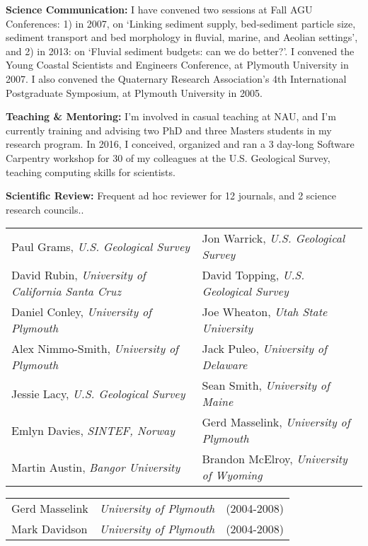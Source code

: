 \listing
{\bf Science Communication:} I have convened two sessions at Fall AGU Conferences: 1) in 2007, on ‘Linking sediment supply, bed-sediment particle size, sediment transport and bed morphology in fluvial, marine, and Aeolian settings’, and 2) in 2013: on ‘Fluvial sediment budgets: can we do better?’. I convened the Young Coastal Scientists and Engineers Conference, at Plymouth University in 2007. I also convened the Quaternary Research Association’s 4th International Postgraduate Symposium, at Plymouth University in 2005.

\listing
{\bf Teaching \& Mentoring:} I'm involved in casual teaching at NAU, and I’m currently training and advising two PhD and three Masters students in my research program. In 2016, I conceived, organized and ran a 3 day-long Software Carpentry workshop for 30 of my colleagues at the U.S. Geological Survey, teaching computing skills for scientists.

\listing
{\bf Scientific Review:} Frequent ad hoc reviewer for 12 journals, and 2 science research councils..



 \hskip -0.1in \begin{tabular}{ll}
Paul Grams, {\it U.S. Geological Survey} & Jon Warrick, {\it U.S. Geological Survey}\\
David Rubin, {\it University of California Santa Cruz} & David Topping, {\it U.S. Geological Survey}\\
Daniel Conley, {\it University of Plymouth} & Joe Wheaton, {\it Utah State University}\\
Alex Nimmo-Smith, {\it University of Plymouth} & Jack Puleo, {\it University of Delaware}\\
Jessie Lacy, {\it U.S. Geological Survey} & Sean Smith, {\it University of Maine}\\
Emlyn Davies, {\it SINTEF, Norway} & Gerd Masselink, {\it University of Plymouth}\\
Martin Austin, {\it Bangor University} & Brandon McElroy, {\it University of Wyoming}\\
\end{tabular}


\hskip -0.1in \begin{tabular}{lll}
  Gerd Masselink & {\it University of Plymouth} & (2004-2008)\\
  Mark Davidson & {\it University of Plymouth} & (2004-2008)\\
\end{tabular}


